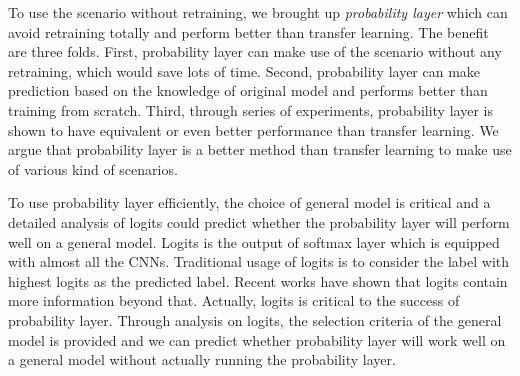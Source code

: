 \documentclass{article}
\begin{document}
To use the scenario without retraining, we brought up \textit{probability layer} which can avoid retraining totally and perform better than transfer learning. The benefit are three folds. First, probability layer can make use of the scenario without any retraining, which would save lots of time. Second, probability layer can make prediction based on the knowledge of original model and performs better than training from scratch. Third, through series of experiments, probability layer is shown to have equivalent or even better performance than transfer learning. We argue that probability layer is a better method than transfer learning to make use of various kind of scenarios. 

{\color{blue}To use probability layer efficiently, the choice of general model is critical and a detailed analysis of logits could predict whether the probability layer will perform well on a general model. Logits is the output of softmax layer which is equipped with almost all the CNNs. Traditional usage of logits is to consider the label with highest logits as the predicted label. Recent works \cite{ba2014deep, bucilua2006model, hinton2015distilling, lopez2015unifying} have shown that logits contain more information beyond that. Actually, logits is critical to the success of probability layer. Through analysis on logits, the selection criteria of the general model is provided and we can predict whether probability layer will work well on a general model without actually running the probability layer.} 
\end{document}

